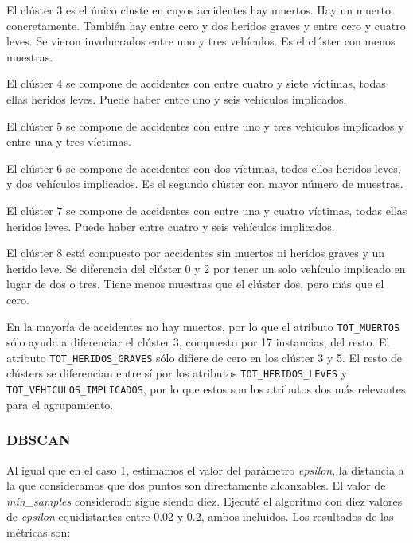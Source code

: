 \documentclass[a4]{article}
\begin{document}
El clúster $3$ es el único cluste en cuyos accidentes hay muertos. Hay un muerto concretamente. También hay entre cero y dos heridos graves y entre cero y cuatro leves. Se vieron involucrados entre uno y tres vehículos. Es el clúster con menos muestras.

El clúster $4$ se compone de accidentes con entre cuatro y siete víctimas, todas ellas heridos leves. Puede haber entre uno y seis vehículos implicados.

El clúster $5$ se compone de accidentes con entre uno y tres vehículos implicados y entre una y tres víctimas.

El clúster $6$ se compone de accidentes con dos víctimas, todos ellos heridos leves, y dos vehículos implicados. Es el segundo clúster con mayor número de muestras.

El clúster $7$ se compone de accidentes con entre una y cuatro víctimas, todas ellas heridos leves. Puede haber entre cuatro y seis vehículos implicados.

El clúster $8$ está compuesto por accidentes sin muertos ni heridos graves y un herido leve. Se diferencia del clúster 0 y 2 por tener un solo vehículo implicado en lugar de dos o tres. Tiene menos muestras que el clúster dos, pero más que el cero.

En la mayoría de accidentes no hay muertos, por lo que el atributo \texttt{TOT\_MUERTOS} sólo ayuda a diferenciar el clúster 3, compuesto por 17 instancias, del resto. El atributo \texttt{TOT\_HERIDOS\_GRAVES} sólo difiere de cero en los clúster 3 y 5. El resto de clústers se diferencian entre sí por los atributos \texttt{TOT\_HERIDOS\_LEVES} y \texttt{TOT\_VEHICULOS\_IMPLICADOS}, por lo que estos son los atributos dos más relevantes para el agrupamiento.

\subsubsection{DBSCAN}

Al igual que en el caso 1, estimamos el valor del parámetro \textit{epsilon}, la distancia a la que consideramos que dos puntos son directamente alcanzables. El valor de \textit{min\_samples} considerado sigue siendo diez. Ejecuté el algoritmo con diez valores de \textit{epsilon} equidistantes entre 0.02 y 0.2, ambos incluidos. Los resultados de las métricas son:
\end{document}
